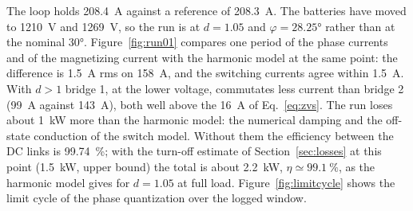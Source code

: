 \documentclass[12pt,a4paper]{scrartcl}
\newcommand{\ped}[1]{_{\mathrm{#1}}}
\begin{document}
\begin{onehalfspace}
The loop holds \SI{208.4}{\ampere} against a reference of \SI{208.3}{\ampere}. The batteries have moved to \SI{1210}{\volt} and \SI{1269}{\volt}, so the run is at $d = 1.05$ and $\varphi = \ang{28.25}$ rather than at the nominal \ang{30}. Figure~\ref{fig:run01} compares one period of the phase currents and of the magnetizing current with the harmonic model at the same point: the difference is \SI{1.5}{\ampere} rms on \SI{158}{\ampere}, and the switching currents agree within \SI{1.5}{\ampere}. With $d > 1$ bridge 1, at the lower voltage, commutates less current than bridge 2 (\SI{99}{\ampere} against \SI{143}{\ampere}), both well above the \SI{16}{\ampere} of Eq.~\eqref{eq:zvs}. The run loses about \SI{1}{\kilo\watt} more than the harmonic model: the numerical damping and the off-state conduction of the switch model. Without them the efficiency between the DC links is \SI{99.74}{\percent}; with the turn-off estimate of Section~\ref{sec:losses} at this point (\SI{1.5}{\kilo\watt}, upper bound) the total is about \SI{2.2}{\kilo\watt}, $\eta \simeq \SI{99.1}{\percent}$, as the harmonic model gives for $d = 1.05$ at full load. Figure~\ref{fig:limitcycle} shows the limit cycle of the phase quantization over the logged window.

\begin{figure}[H]
	\centering


\end{figure}
\end{onehalfspace}
\end{document}
